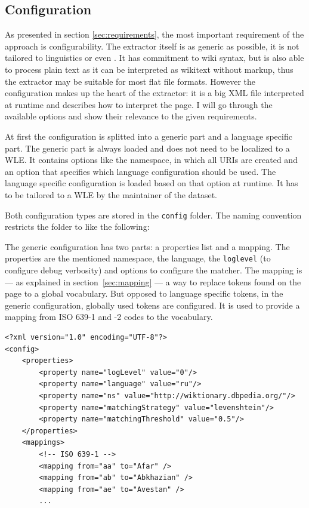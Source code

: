 \subsection{Configuration}
As presented in section \ref{sec:requirements}, the most important requirement of the approach is configurability. The extractor itself is as generic as possible, it is not tailored to linguistics or even \wik. It has commitment to wiki syntax, but is also able to process plain text as it can be interpreted as wikitext without markup, thus the extractor may be suitable for most flat file formats. However the configuration makes up the heart of the extractor: it is a big XML file interpreted at runtime and describes how to interpret the page. I will go through the available options and show their relevance to the given requirements.

At first the configuration is splitted into a generic part and a language specific part. The generic part is always loaded and does not need to be localized to a WLE. It contains options like the namespace, in which all URIs are created and an option that specifies which language configuration should be used. The language specific configuration is loaded based on that option at runtime. It has to be tailored to a WLE by the maintainer of the dataset.

Both configuration types are stored in the \texttt{config} folder. The naming convention restricts the folder to like the following:

The generic configuration has two parts: a properties list and a mapping. The properties are the mentioned namespace, the language, the \texttt{loglevel} (to configure debug verbosity) and options to configure the matcher. The mapping is --- as explained in section~\ref{sec:mapping} --- a way to replace tokens found on the page to a global vocabulary. But opposed to language specific tokens, in the generic configuration, globally used tokens are configured. It is used to provide a mapping from ISO 639-1 and -2 codes to the \wik vocabulary.

\begin{lstlisting}[style=XML]
<?xml version="1.0" encoding="UTF-8"?>
<config>
    <properties>
        <property name="logLevel" value="0"/>
        <property name="language" value="ru"/>
        <property name="ns" value="http://wiktionary.dbpedia.org/"/>
        <property name="matchingStrategy" value="levenshtein"/>
        <property name="matchingThreshold" value="0.5"/>
    </properties>
    <mappings>
        <!-- ISO 639-1 -->
        <mapping from="aa" to="Afar" />
        <mapping from="ab" to="Abkhazian" />
        <mapping from="ae" to="Avestan" />
        ...
\end{lstlisting}



\newpage

